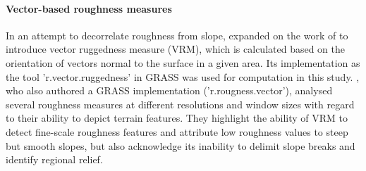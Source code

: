 \documentclass[preprint,12pt,authoryear]{elsarticle}
\begin{document}
\paragraph{Vector-based roughness measures}
 In an attempt to decorrelate roughness from slope, \cite{Sappington2007} expanded on the work of \cite{Hobson1972} to introduce vector ruggedness measure (VRM), which is calculated based on the orientation of vectors normal to the surface in a given area. Its implementation as the tool 'r.vector.ruggedness' in GRASS was used for computation in this study.  \cite{Grohmann2010}, who also authored a GRASS implementation ('r.rougness.vector'), analysed several roughness measures at different resolutions and window sizes with regard to their ability to depict terrain features. They highlight the ability of VRM to detect fine-scale roughness features and attribute low roughness values to steep but smooth slopes, but also acknowledge its inability to delimit slope breaks and identify regional relief.
\end{document}
